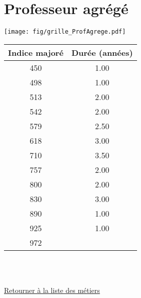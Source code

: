 \newpage 
 
\chapter{Professeur agrégé} 

\begin{minipage}{0.55\linewidth}\texttt{[image: fig/grille\_ProfAgrege.pdf]}\end{minipage} 
\begin{minipage}{0.3\linewidth} 
 \begin{center} 

\begin{tabular}[htb]{|c|c|} 
\hline 
 Indice majoré &  Durée (années) \\ 
\hline \hline 
 450 &  1.00 \\ 
\hline 
 498 &  1.00 \\ 
\hline 
 513 &  2.00 \\ 
\hline 
 542 &  2.00 \\ 
\hline 
 579 &  2.50 \\ 
\hline 
 618 &  3.00 \\ 
\hline 
 710 &  3.50 \\ 
\hline 
 757 &  2.00 \\ 
\hline 
 800 &  2.00 \\ 
\hline 
 830 &  3.00 \\ 
\hline 
 890 &  1.00 \\ 
\hline 
 925 &  1.00 \\ 
\hline 
 972 &   \\ 
\hline 
\hline 
\end{tabular} 
\end{center} 
 \end{minipage} 

~\\ 
 


   
 \localtableofcontents 

~\\ 
 
 \hyperlink{page.2}{\noindent Retourner à la liste des métiers}

 \newpage 

